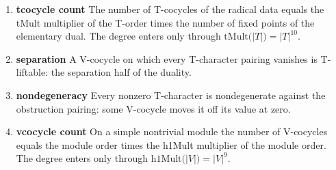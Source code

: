 \begin{enumerate}
\item[(1)] \textbf{tcocycle count} The number of T-cocycles of the radical data equals the tMult multiplier of the T-order times the number of fixed points of the elementary dual. The degree enters only through $\mathrm{tMult}\bigl(\lvert T\rvert\bigr)=\lvert T\rvert^{10}$.
\item[(2)] \textbf{separation} A V-cocycle on which every T-character pairing vanishes is T-liftable: the separation half of the duality.
\item[(3)] \textbf{nondegeneracy} Every nonzero T-character is nondegenerate against the obstruction pairing: some V-cocycle moves it off its value at zero.
\item[(4)] \textbf{vcocycle count} On a simple nontrivial module the number of V-cocycles equals the module order times the h1Mult multiplier of the module order. The degree enters only through $\mathrm{h1Mult}\bigl(\lvert V\rvert\bigr)=\lvert V\rvert^{9}$.
\end{enumerate}
